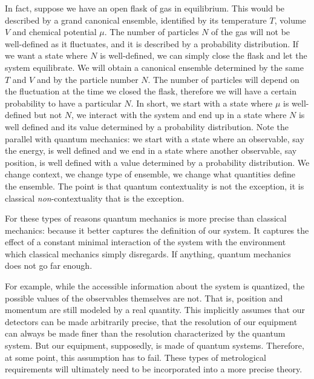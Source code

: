 \documentclass[10pt,twocolumn, nofootinbib]{revtex4-2}
\begin{document}
In fact, suppose we have an open flask of gas in equilibrium. This would be described by a grand canonical ensemble, identified by its temperature $T$, volume $V$ and chemical potential $\mu$. The number of particles $N$ of the gas will not be well-defined as it fluctuates, and it is described by a probability distribution. If we want a state where $N$ is well-defined, we can simply close the flask and let the system equilibrate. We will obtain a canonical ensemble determined by the same $T$ and $V$ and by the particle number $N$. The number of particles will depend on the fluctuation at the time we closed the flask, therefore we will have a certain probability to have a particular $N$. In short, we start with a state where $\mu$ is well-defined but not $N$, we interact with the system and end up in a state where $N$ is well defined and its value determined by a probability distribution. Note the parallel with quantum mechanics: we start with a state where an observable, say the energy, is well defined and we end in a state where another observable, say position, is well defined with a value determined by a probability distribution. We change context, we change type of ensemble, we change what quantities define the ensemble. The point is that quantum contextuality is not the exception, it is classical \emph{non}-contextuality that is the exception.

For these types of reasons quantum mechanics is more precise than classical mechanics: because it better captures the definition of our system. It captures the effect of a constant minimal interaction of the system  with the environment which classical mechanics simply disregards. If anything, quantum mechanics does not go far enough.

For example, while the accessible information about the system is quantized, the possible values of the observables themselves are not. That is, position and momentum are still modeled by a real quantity. This implicitly assumes that our detectors can be made arbitrarily precise, that the resolution of our equipment can always be made finer than the resolution characterized by the quantum system. But our equipment, supposedly, is made of quantum systems. Therefore, at some point, this assumption has to fail. These types of metrological requirements will ultimately need to be incorporated into a more precise theory.
\end{document}
